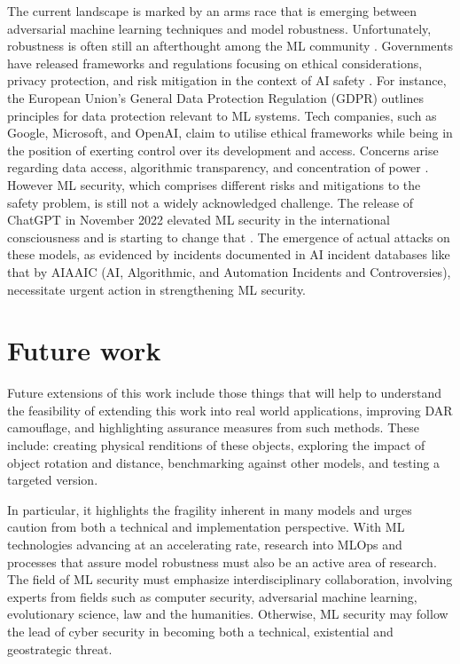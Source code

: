 \documentclass{article}
\begin{document}
The current landscape is marked by an arms race that is emerging between adversarial machine learning techniques and model robustness. Unfortunately, robustness is often still an afterthought among the ML community \cite{kumar_adversarial_2021}. Governments have released frameworks and regulations focusing on ethical considerations, privacy protection, and risk mitigation in the context of AI safety \cite{noauthor_attacking_nodate}. For instance, the European Union's General Data Protection Regulation (GDPR) outlines principles for data protection relevant to ML systems. Tech companies, such as Google, Microsoft, and OpenAI, claim to utilise ethical frameworks while being in the position of exerting control over its development and access. Concerns arise regarding data access, algorithmic transparency, and concentration of power \cite{noauthor_attacking_nodate}. However ML security, which comprises different risks and mitigations to the safety problem, is still not a widely acknowledged challenge. The release of ChatGPT in November 2022 elevated ML security in the international consciousness and is starting to change that \cite{yampolskiy_artificial_2016}. The emergence of actual attacks on these models, as evidenced by incidents documented in AI incident databases like that by AIAAIC (AI, Algorithmic, and Automation Incidents and Controversies), necessitate urgent action in strengthening ML security.

\section{Future work} 

Future extensions of this work include those things that will help to understand the feasibility of extending this work into real world applications, improving DAR camouflage, and highlighting assurance measures from such methods. These include: creating physical renditions of these objects, exploring the impact of object rotation and distance, benchmarking against other models, and testing a targeted version. 

In particular, it highlights the fragility inherent in many models and urges caution from both a technical and implementation perspective. With ML technologies advancing at an accelerating rate, research into MLOps and processes that assure model robustness must also be an active area of research. The field of ML security must emphasize interdisciplinary collaboration, involving experts from fields such as computer security, adversarial machine learning, evolutionary science, law and the humanities. Otherwise, ML security may follow the lead of cyber security in becoming both a technical, existential and geostrategic threat.     
\end{document}
